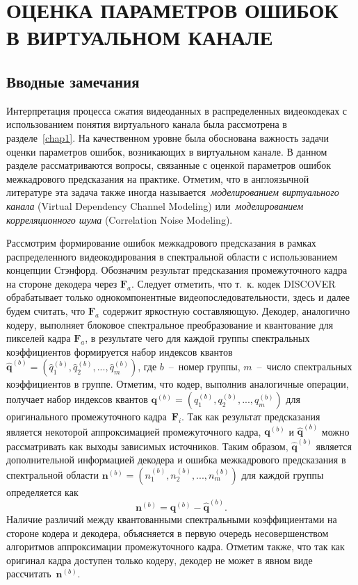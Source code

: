 \chapter{ОЦЕНКА ПАРАМЕТРОВ ОШИБОК В ВИРТУАЛЬНОМ КАНАЛЕ}
\label{chap:CNM}

\section{Вводные замечания}
\label{chap:CNM:Intro}

Интерпретация процесса сжатия видеоданных в распределенных видеокодеках с использованием понятия виртуального канала была рассмотрена в разделе~\ref{chap1}. На качественном уровне была обоснована важность задачи оценки параметров ошибок, возникающих в виртуальном канале. В данном разделе рассматриваются вопросы, связанные с оценкой параметров ошибок межкадрового предсказания на практике. Отметим, что в англоязычной литературе эта задача также иногда называется~\emph{моделированием виртуального канала} (Virtual Dependency Channel Modeling) или~\emph{моделированием корреляционного шума} (Correlation Noise Modeling).

Рассмотрим формирование ошибок межкадрового предсказания в рамках распределенного видеокодирования в спектральной области с использованием концепции Стэнфорд. Обозначим результат предсказания промежуточного кадра на стороне декодера через $\mathbf{F}_a$. Следует отметить, что т.~к. кодек DISCOVER обрабатывает только однокомпонентные видеопоследовательности, здесь и далее будем считать, что $\mathbf{F}_a$ содержит яркостную составляющую. Декодер, аналогично кодеру, выполняет блоковое спектральное преобразование и квантование для пикселей кадра $\mathbf{F}_a$, в результате чего для каждой группы спектральных коэффициентов формируется набор индексов квантов $\hat{\mathbf{q}}^{(b)}=(\hat{q}^{(b)}_1,\hat{q}^{(b)}_2,...,\hat{q}^{(b)}_m)$, где $b$~--~номер группы, $m$~--~число спектральных коэффициентов в группе. Отметим, что кодер, выполнив аналогичные операции, получает набор индексов квантов $\mathbf{q}^{(b)}=(q^{(b)}_1,q^{(b)}_2,...,q^{(b)}_m)$ для оригинального промежуточного кадра~$\mathbf{F}_i$.
Так как результат предсказания является некоторой аппроксимацией промежуточного кадра, $\mathbf{q}^{(b)}$ и $\hat{\mathbf{q}}^{(b)}$ можно рассматривать как выходы зависимых источников. Таким образом, $\hat{\mathbf{q}}^{(b)}$ является дополнительной информацией декодера и ошибка межкадрового предсказания в спектральной области $\mathbf{n}^{(b)}=(n^{(b)}_1,n^{(b)}_2,...,n^{(b)}_m)$ для каждой группы определяется как
\begin{equation*}
\mathbf{n}^{(b)} = \mathbf{q}^{(b)} - \hat{\mathbf{q}}^{(b)}.
\end{equation*}
Наличие различий между квантованными спектральными коэффициентами на стороне кодера и декодера, объясняется в первую очередь несовершенством алгоритмов аппроксимации промежуточного кадра. Отметим также, что так как оригинал кадра доступен только кодеру, декодер не может в явном виде рассчитать~$\mathbf{n}^{(b)}$.

